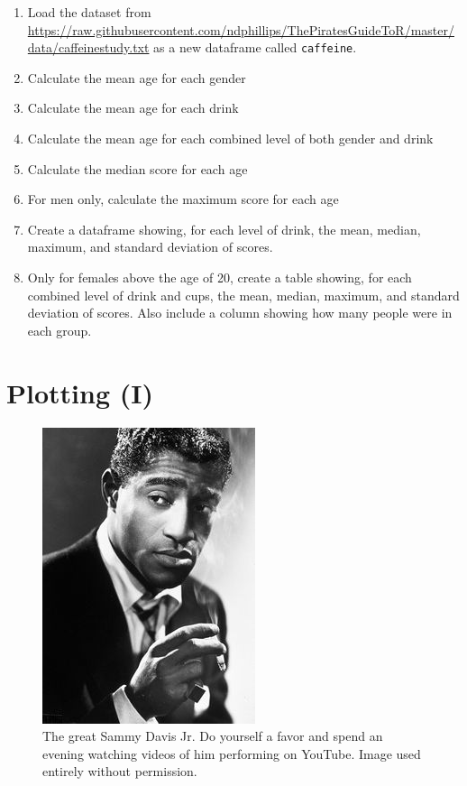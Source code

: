 \documentclass[]{book}
\theoremstyle{definition}
\theoremstyle{definition}
\theoremstyle{remark}
\begin{document}
\begin{enumerate}
\def\labelenumi{\arabic{enumi}.}
\item
  Load the dataset from
  \url{https://raw.githubusercontent.com/ndphillips/ThePiratesGuideToR/master/data/caffeinestudy.txt}
  as a new dataframe called \texttt{caffeine}.
\item
  Calculate the mean age for each gender
\item
  Calculate the mean age for each drink
\item
  Calculate the mean age for each combined level of both gender and
  drink
\item
  Calculate the median score for each age
\item
  For men only, calculate the maximum score for each age
\item
  Create a dataframe showing, for each level of drink, the mean, median,
  maximum, and standard deviation of scores.
\item
  Only for females above the age of 20, create a table showing, for each
  combined level of drink and cups, the mean, median, maximum, and
  standard deviation of scores. Also include a column showing how many
  people were in each group.
\end{enumerate}

\chapter{Plotting (I)}\label{plotting1}

\begin{figure}

{\centering \includegraphics[width=0.75\linewidth]{images/sammy} 

}

\caption{The great Sammy Davis Jr. Do yourself a favor and spend an evening watching videos of him performing on YouTube. Image used entirely without permission.}\label{fig:sammy}
\end{figure}
\end{document}
